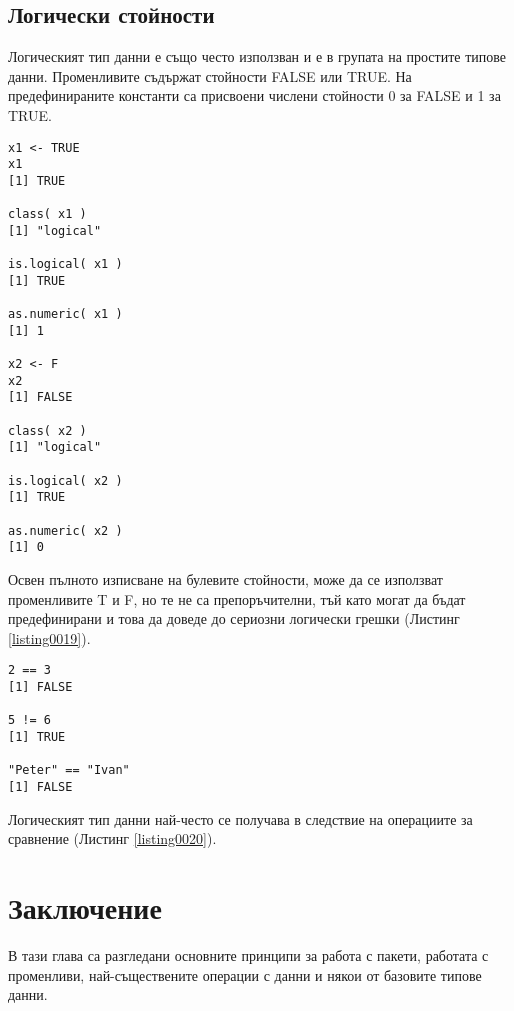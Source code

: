 \subsection{Логически стойности}

Логическият тип данни е също често използван и е в групата на простите типове данни. Променливите съдържат стойности FALSE или TRUE. На предефинираните константи са присвоени числени стойности 0 за FALSE и 1 за TRUE.

\begin{lstlisting}[caption=Логически тип данни, label=listing0019]
x1 <- TRUE
x1
[1] TRUE

class( x1 )
[1] "logical"

is.logical( x1 )
[1] TRUE

as.numeric( x1 )
[1] 1

x2 <- F
x2
[1] FALSE

class( x2 )
[1] "logical"

is.logical( x2 )
[1] TRUE

as.numeric( x2 )
[1] 0
\end{lstlisting}

Освен пълното изписване на булевите стойности, може да се използват променливите T и F, но те не са препоръчителни, тъй като могат да бъдат предефинирани и това да доведе до сериозни логически грешки (Листинг \ref{listing0019}).

\begin{lstlisting}[caption=Операции за сравнение, label=listing0020]
2 == 3
[1] FALSE

5 != 6
[1] TRUE

"Peter" == "Ivan"
[1] FALSE
\end{lstlisting}

Логическият тип данни най-често се получава в следствие на операциите за сравнение (Листинг \ref{listing0020}).

\section*{Заключение}

В тази глава са разгледани основните принципи за работа с пакети, работата с променливи, най-съществените операции с данни и някои от базовите типове данни.
